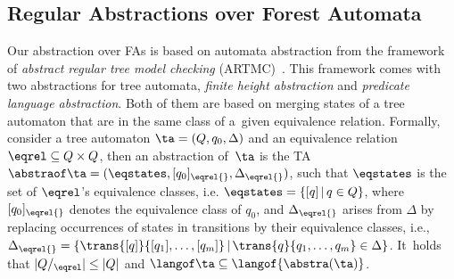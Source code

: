 \subsection{Regular Abstractions over Forest Automata}\label{sec:abstraction}

Our abstraction over FAs is based on automata abstraction
from the framework of \emph{abstract regular tree model checking}
(ARTMC)~\cite{artmc}.
This framework comes with two abstractions for tree automata, 
\emph{finite height abstraction} and \emph{predicate language abstraction}.
Both of them are based on merging states of a tree automaton that are in the
same class 
of a~given equivalence relation. 
%
Formally, consider a tree automaton $\ta=(Q, q_0, \Delta)$ and an equivalence
relation ${\eqrel} \subseteq Q \times Q$,
then an abstraction of~$\ta$ is
%
%
%
the TA $\abstraof \ta =( \eqstates,[q_0]_{\eqrel{}},\Delta_{\eqrel{}} )$,
such that $\eqstates$ is the set of
$\eqrel$'s equivalence classes, i.e. $\eqstates = \{[q]\,|\, q\in Q\}$, where
$[q_0]_{\eqrel{}}$ denotes the equivalence class
of $q_0$,  and $\Delta_{\eqrel{}}$ arises from $\Delta$ by replacing
occurrences of states in transitions by their equivalence classes, i.e., $\Delta_{\eqrel{}}=\{\trans{[q]}{[q_1], \dots, [q_m]}
\,|\, \trans{q}{q_1, \dots, q_m} \in \Delta\}$.
%
%
It~holds that $|Q/_{\eqrel}| \leq |Q|$ and
$\langof \ta \subseteq \langof{\abstra(\ta)}$.
%

